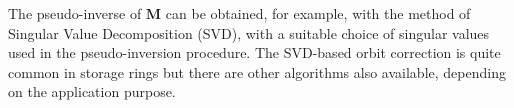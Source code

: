 \documentclass[../sands-adaptation.tex]{subfiles}
\begin{document}
 The pseudo-inverse of $\mathbf{M}$ can be obtained, for example, with the method of Singular Value Decomposition (SVD), with a suitable choice of singular values used in the pseudo-inversion procedure. The SVD-based orbit correction is quite common in storage rings but there are other algorithms also available, depending on the application purpose.
\end{document}
